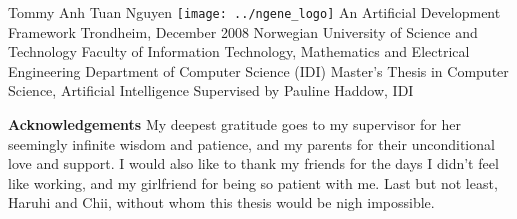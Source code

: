 \documentclass[12pt,a4paper]{article}
\begin{document}
	\begin{titlepage}
		\changepage{}{}{2cm}{2cm}{}{3cm}{}{}{}
		\large\noindent
		Tommy Anh Tuan Nguyen\newline\newline\newline
		\texttt{[image: ../ngene\_logo]}\newline
		{\LARGE An Artificial Development Framework}\newline
		\newline
		\newline
		\newline
		\newline
		\newline
		\newline
		Trondheim, December 2008\newline
		\newline
		\newline
		{\Large Norwegian University of Science and Technology}\newline
		Faculty of Information Technology, Mathematics\newline
		and Electrical Engineering\newline
		Department of Computer Science (IDI)\newline
		\newline
		\newline
		Master's Thesis in Computer Science, Artificial Intelligence\newline
		\newline
		Supervised by Pauline Haddow, IDI
	\end{titlepage}
	
	\newpage
	\noindent\textbf{\large Acknowledgements}\newline
	My deepest gratitude goes to my supervisor for her seemingly infinite wisdom and patience, and my parents for their unconditional love and support. I would also like to thank my friends for the days I didn't feel like working, and my girlfriend for being so patient with me.\newline
	\newline
	Last but not least, Haruhi and Chii, without whom this thesis would be nigh impossible.
	\newpage
	\pagestyle{headings}
	\tableofcontents
	\listoffigures
	\newpage
	
	
	
	
	
	
	
	
	
\end{document}
